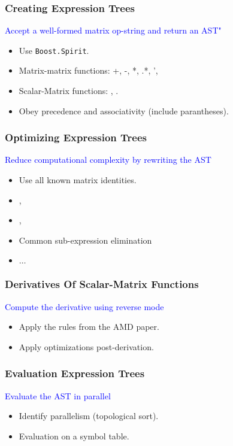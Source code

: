 \begin{frame}
\frametitle{Creating Expression Trees}
%
\begin{center}
\textcolor{blue}{Accept a well-formed matrix op-string and return an AST"}
\end{center}
%
\begin{itemize}
\item Use \texttt{Boost.Spirit}.
\item Matrix-matrix functions: +, -, *, .*, ',\textunderscore{}
\item Scalar-Matrix functions: , .
\item Obey precedence and associativity (include parantheses).
\end{itemize}
%
\end{frame}

\begin{frame}
\frametitle{Optimizing Expression Trees}
%
\begin{center}
\textcolor{blue}{Reduce computational complexity by rewriting the AST}
\end{center}
%
\begin{itemize}
\item Use all known matrix identities.
\item {}, 
\item {}, 
\item Common sub-expression elimination
\item $\ldots{}$
\end{itemize}
%
\end{frame}

\begin{frame}
\frametitle{Derivatives Of Scalar-Matrix Functions}
%
\begin{center}
\textcolor{blue}{Compute the derivative using reverse mode}
\end{center}
%
\begin{itemize}
\item Apply the rules from the AMD paper.
\item Apply optimizations post-derivation.
\end{itemize}
%
\end{frame}

\begin{frame}
\frametitle{Evaluation Expression Trees}
%
\begin{center}
\textcolor{blue}{Evaluate the AST in parallel}
\end{center}
%
\begin{itemize}
\item Identify parallelism (topological sort).
\item Evaluation on a symbol table.
\end{itemize}
%
\end{frame}

